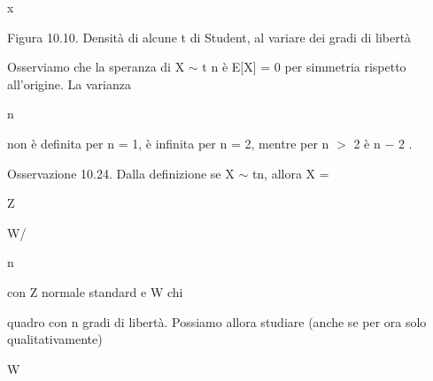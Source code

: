\documentclass[a4paper,portrait,12pt]{article}
\begin{document}
\begin{flushleft}
x
\end{flushleft}


\begin{flushleft}
Figura 10.10. Densit\`{a} di alcune t di Student, al variare dei gradi di libert\`{a}
\end{flushleft}





\begin{flushleft}
Osserviamo che la speranza di X $\sim$ t n \`{e} E[X] = 0 per simmetria rispetto all'origine. La varianza
\end{flushleft}


\begin{flushleft}
n
\end{flushleft}


\begin{flushleft}
non \`{e} definita per n = 1, \`{e} infinita per n = 2, mentre per n $>$ 2 \`{e} n $-$ 2 .
\end{flushleft}


\begin{flushleft}
Osservazione 10.24. Dalla definizione se X $\sim$ tn, allora X =
\end{flushleft}





\begin{flushleft}
Z
\end{flushleft}


\begin{flushleft}
W/
\end{flushleft}


\begin{flushleft}
n
\end{flushleft}





\begin{flushleft}
con Z normale standard e W chi
\end{flushleft}





\begin{flushleft}
quadro con n gradi di libert\`{a}. Possiamo allora studiare (anche se per ora solo qualitativamente)
\end{flushleft}


\begin{flushleft}
W
\end{flushleft}
\end{document}
